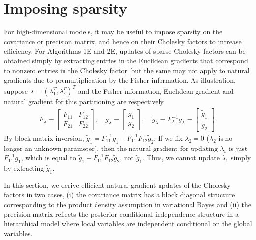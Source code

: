 \documentclass{statsoc}
\begin{document}
\section{Imposing sparsity} \label{sec imposing sparsity}
For high-dimensional models, it may be useful to impose sparsity on the covariance or precision matrix, and hence on their Cholesky factors to increase efficiency. For Algorithms 1E and 2E, updates of sparse Cholesky factors can be obtained simply by extracting entries in the Euclidean gradients that correspond to nonzero entries in the Cholesky factor, but the same may not apply to natural gradients due to premultiplication by the Fisher information. As illustration, suppose $\lambda = (\lambda_1^T , \lambda_2^T )^T $ and the Fisher information, Euclidean gradient and natural gradient for this partitioning are respectively
\begin{align*}
F_\lambda = \begin{bmatrix} F_{11} & F_{12} \\ F_{21} & F_{22} \end{bmatrix}, \quad 
g_\lambda = \begin{bmatrix} g_1 \\ g_2 \end{bmatrix}, \quad 
\widetilde{g}_\lambda = F_\lambda^{-1} g_\lambda =  \begin{bmatrix} \widetilde{g}_1 \\ \widetilde{g}_2 \end{bmatrix}.
\end{align*}
By block matrix inversion, $\widetilde{g}_1 = F_{11}^{-1}g_1 - F_{11}^{-1} F_{12} \widetilde{g}_2$. If we fix $\lambda_2 = 0$ ($\lambda_2$ is no longer an unknown parameter), then the natural gradient for updating $\lambda_1$ is just $F_{11}^{-1} g_1$, which is equal to $\widetilde{g}_1 + F_{11}^{-1} F_{12} \widetilde{g}_2$, not $\widetilde{g}_1$. Thus, we cannot update $\lambda_1$ simply by extracting $\widetilde{g}_1$. 

In this section, we derive efficient natural gradient updates of the Cholesky factors in two cases, (i) the covariance matrix has a block diagonal structure corresponding to the product density assumption in variational Bayes and (ii) the precision matrix reflects the posterior conditional independence structure in a hierarchical model where local variables are independent conditional on the global variables.
\end{document}
